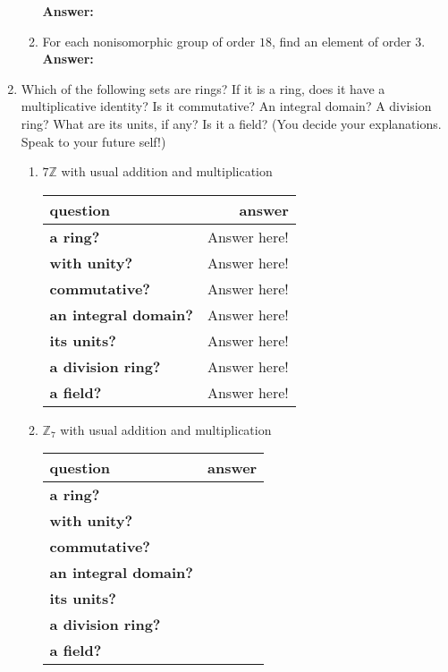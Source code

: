 \documentclass[12pt]{article}
\begin{document}
\begin{enumerate}
\begin{enumerate}
	\textbf{Answer:}\\

	\vfill
	\item For each nonisomorphic group of order $18$, find an element of order 3.\\
	
	\textbf{Answer:}\\

	\vfill
	\end{enumerate}
\newpage
\item Which of the following sets are rings? If it is a ring, does it have a multiplicative identity? Is it commutative? An integral domain? A division ring? What are its units, if any? Is it a field? (You decide your explanations. Speak to your future self!)\\
	\begin{enumerate}
	\item $7\mathbb{Z}$ with usual addition and multiplication\\
	
	\begin{tabular}{lr}
	question&answer\\
	\hline
	\textbf{a ring?}& Answer here!\\
	\textbf{with unity?}& Answer here!\\
	\textbf{commutative?}& Answer here!\\
	\textbf{an integral domain?}& Answer here!\\
	\textbf{its units?}& Answer here!\\
	\textbf{a division ring?}& Answer here!\\
	\textbf{a field?}& Answer here!\\
	\end{tabular}
	\vfill
	
	\item $\mathbb{Z}_7$ with usual addition and multiplication\\
	
	\begin{tabular}{lr}
	question&answer\\
	\hline
	\textbf{a ring?}&\\
	\textbf{with unity?}&\\
	\textbf{commutative?}&\\
	\textbf{an integral domain?}&\\
	\textbf{its units?}&\\
	\textbf{a division ring?}&\\
	\textbf{a field?}&\\
	\end{tabular}


\end{enumerate}
\end{enumerate}
\end{document}
